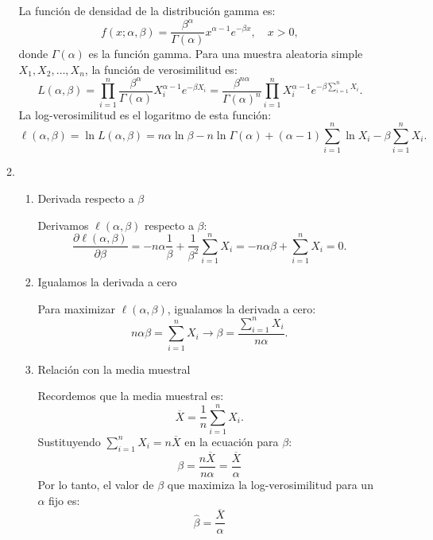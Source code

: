\begin{enumerate}[label=\color{red}\textbf{\arabic*)}]
\begin{enumerate}[label=\color{red}\textbf{\alph*)}]
                La función de densidad de la distribución gamma es: \[
                f(x;\alpha,\beta)=\dfrac{\beta^{\alpha}}{\Gamma(\alpha)}x^{\alpha-1}e^{-\beta x},\quad x>0, 
                \] 
                donde $\Gamma(\alpha)$ es la función gamma. Para una muestra aleatoria simple $X_1,X_2,\dots,X_n$, la función de verosimilitud es: \[
                L(\alpha,\beta)=\prod_{i=1}^{n} \dfrac{\beta^{\alpha}}{\Gamma(\alpha)} X_i^{\alpha-1}e^{-\beta X_i}=\dfrac{\beta^{n\alpha}}{\Gamma(\alpha)^n}\prod_{i=1}^{n} X_i^{\alpha-1}e^{-\beta \sum_{i=1}^{n} X_i}  . 
                \] 
                La log-verosimilitud es el logaritmo de esta función: \[
                \ell(\alpha,\beta)=\ln L(\alpha,\beta)=n\alpha\ln\beta-n\ln\Gamma(\alpha)+(\alpha-1)\sum_{i=1}^{n} \ln X_i-\beta \sum_{i=1}^{n} X_i.
                \] 
        \item {}

        \begin{enumerate}[label=Paso \arabic*:]
            \item Derivada respecto a $\beta$

                Derivamos $\ell(\alpha,\beta)$ respecto a $\beta$: \[
                \frac{\partial \ell(\alpha,\beta)}{\partial \beta}=-n\alpha \dfrac{1}{\beta}+\dfrac{1}{\beta^2}\sum_{i=1}^{n} X_i=-n\alpha\beta+\sum_{i=1}^{n} X_i=0. 
                \] 
            \item Igualamos la derivada a cero

                Para maximizar $\ell(\alpha,\beta)$, igualamos la derivada a cero: \[
                    n\alpha\beta=\sum_{i=1}^{n} X_i\longrightarrow \beta=\dfrac{\sum_{i=1}^{n} X_i}{n\alpha}.
                \] 
            \item Relación con la media muestral

                Recordemos que la media muestral es: \[
                \overline{X}=\dfrac{1}{n}\sum_{i=1}^{n} X_i.
                \] 
                Sustituyendo $\sum_{i=1}^{n} X_i=n\overline{X}$ en la ecuación para $\beta$: \[
                    \beta=\dfrac{n\overline{X}}{n\alpha}=\dfrac{\overline{X}}{\alpha}
                \] 
                Por lo tanto, el valor de $\beta$ que maximiza la log-verosimilitud para un $\alpha$ fijo es: \[
                \hat{\beta}=\dfrac{\overline{X}}{\alpha}
                \] 
        \end{enumerate}
        \end{enumerate}
\end{enumerate}
